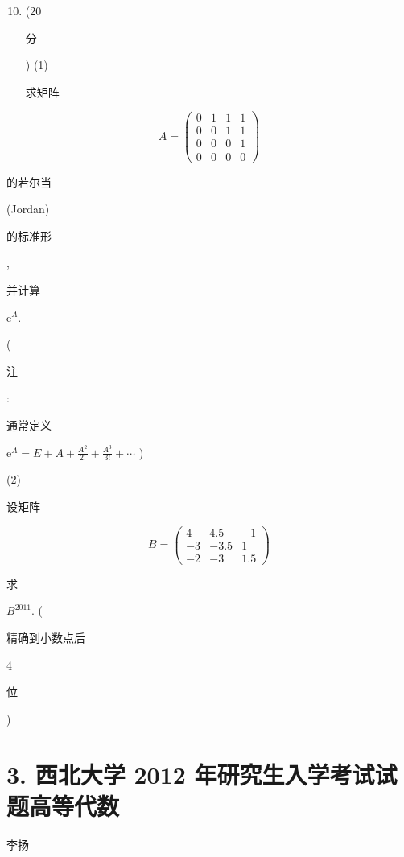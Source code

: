 \documentclass[10pt]{article}
\begin{document}
\begin{enumerate}
  \setcounter{enumi}{9}
  \item (20 \begin{CJK}{UTF8}{mj}分\end{CJK}) (1) \begin{CJK}{UTF8}{mj}求矩阵\end{CJK}
\end{enumerate}
$$
A=\left(\begin{array}{llll}
0 & 1 & 1 & 1 \\
0 & 0 & 1 & 1 \\
0 & 0 & 0 & 1 \\
0 & 0 & 0 & 0
\end{array}\right)
$$
\begin{CJK}{UTF8}{mj}的若尔当\end{CJK} (Jordan) \begin{CJK}{UTF8}{mj}的标准形\end{CJK}, \begin{CJK}{UTF8}{mj}并计算\end{CJK} $\mathrm{e}^{A}$.

(\begin{CJK}{UTF8}{mj}注\end{CJK}: \begin{CJK}{UTF8}{mj}通常定义\end{CJK} $\mathrm{e}^{A}=E+A+\frac{A^{2}}{2 !}+\frac{A^{3}}{3 !}+\cdots$ )

(2) \begin{CJK}{UTF8}{mj}设矩阵\end{CJK}
$$
B=\left(\begin{array}{ccc}
4 & 4.5 & -1 \\
-3 & -3.5 & 1 \\
-2 & -3 & 1.5
\end{array}\right)
$$
\begin{CJK}{UTF8}{mj}求\end{CJK} $B^{2011}$. (\begin{CJK}{UTF8}{mj}精确到小数点后\end{CJK} 4 \begin{CJK}{UTF8}{mj}位\end{CJK})

\section{3. 西北大学 2012 年研究生入学考试试题高等代数}
\begin{CJK}{UTF8}{mj}李扬\end{CJK}
\end{document}
